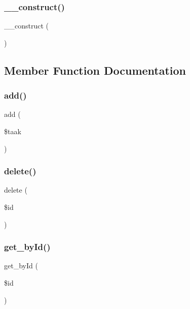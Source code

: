 \subsubsection{\texorpdfstring{\+\_\+\+\_\+construct()}{\_\_construct()}}
{\footnotesize\ttfamily \+\_\+\+\_\+construct (\begin{DoxyParamCaption}{ }\end{DoxyParamCaption})}



\subsection{Member Function Documentation}
\mbox{\label{class_taken___model_ab4986b088d8f7831b9a8dce8e97485bb}} 
\subsubsection{\texorpdfstring{add()}{add()}}
{\footnotesize\ttfamily add (\begin{DoxyParamCaption}\item[{}]{\$taak }\end{DoxyParamCaption})}

\mbox{\label{class_taken___model_a2f8258add505482d7f00ea26493a5723}} 
\subsubsection{\texorpdfstring{delete()}{delete()}}
{\footnotesize\ttfamily delete (\begin{DoxyParamCaption}\item[{}]{\$id }\end{DoxyParamCaption})}

\mbox{\label{class_taken___model_a98d28a4d9a29d40c5a8aa0176f19a919}} 
\subsubsection{\texorpdfstring{get\+\_\+by\+Id()}{get\_byId()}}
{\footnotesize\ttfamily get\+\_\+by\+Id (\begin{DoxyParamCaption}\item[{}]{\$id }\end{DoxyParamCaption})}

